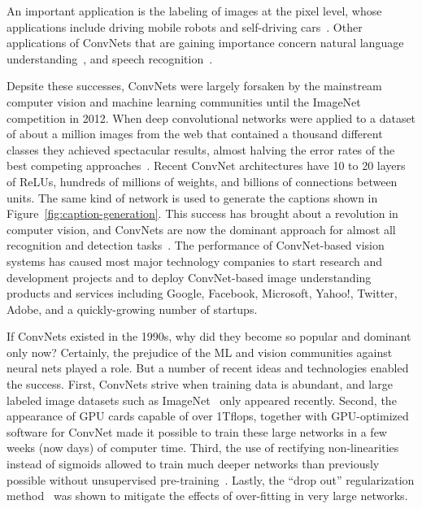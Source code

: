 \documentclass[10pts]{article}
\begin{document}
An important application is the labeling of images at the pixel level,
whose applications include driving mobile robots and self-driving
cars~\cite{hadsell-jfr-09,farabet-icml-12}. Other applications of
ConvNets that are gaining importance concern natural language
understanding~\citep{collobert:2011b}, and speech
recognition~\cite{Sainath-et-al-ICASSP2013}.

Depsite these successes, ConvNets were largely forsaken by the
mainstream computer vision and machine learning communities until the
ImageNet competition in 2012.  When deep convolutional networks were
applied to a dataset of about a million images from the web that
contained a thousand different classes they achieved spectacular
results, almost halving the error rates of the best competing
approaches~\citep{Krizhevsky-2012-small}.  Recent ConvNet
architectures have 10 to 20 layers of ReLUs, hundreds of millions of
weights, and billions of connections between units. The same kind of
network is used to generate the captions shown in
Figure~\ref{fig:caption-generation}. This success has brought about a
revolution in computer vision, and ConvNets are now the dominant
approach for almost all recognition and detection
tasks~\citep{sermanet-iclr-14,girshick-cvpr-2014,taigman-cvpr-2014,simonyan-arxiv-2014,szegedy-2014,Tompson-et-al-arxiv2014}.
The performance of ConvNet-based vision systems has caused most major
technology companies to start research and development projects and to
deploy ConvNet-based image understanding products and services
including Google, Facebook, Microsoft, Yahoo!, Twitter, Adobe, and a
quickly-growing number of startups.

If ConvNets existed in the 1990s, why did they become so popular and
dominant only now? Certainly, the prejudice of the ML and vision
communities against neural nets played a role. But a number of recent
ideas and technologies enabled the success. First, ConvNets strive
when training data is abundant, and large labeled image datasets such
as ImageNet~\citep{imagenet_cvpr09} only appeared recently. Second,
the appearance of GPU cards capable of over 1Tflops, together with
GPU-optimized software for ConvNet made it possible to train these
large networks in a few weeks (now days) of computer time. Third, the
use of rectifying non-linearities instead of sigmoids allowed to train
much deeper networks than previously possible without unsupervised
pre-training~\cite{jarrett-iccv-09,Glorot+al-AI-2011-small}. Lastly,
the ``drop out'' regularization method~\citep{Srivastava14} was shown
to mitigate the effects of over-fitting in very large networks. 
\end{document}

